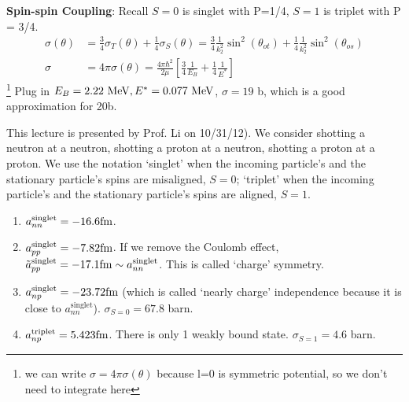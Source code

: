 \documentclass{school-22.101-notes}
\begin{document}
\textbf{Spin-spin Coupling}: Recall $S=0$ is singlet with P=1/4, $S=1$ is triplet with P = 3/4. 
\begin{align}
\sigma( \theta) &= \frac{3}{4} \sigma_T (\theta) + \frac{1}{4} \sigma_S (\theta) = \frac{3}{4} \frac{1}{k_2^2} \sin^2 (\theta_{ot} ) + \frac{1}{4} \frac{1}{k_2^2} \sin^2 (\theta_{os} ) \\
\sigma &= 4 \pi \sigma (\theta) = \frac{4 \pi \hbar^2}{2 \mu} \left[ \frac{3}{4} \frac{1}{E_B} + \frac{1}{4} \frac{1}{E^*} \right] 
\end{align}\footnote{we can write $\sigma = 4 \pi \sigma(\theta)$ because l=0 is symmetric potential, so we don't need to integrate here} 
Plug in $E_B = 2.22 \mbox{ } \mathrm{MeV}, E^* = 0.077 \mbox{ } \mathrm{MeV}$, $\sigma = 19$ b, which is a good approximation for 20b. 



This lecture is presented by Prof. Li on 10/31/12). We consider shotting a neutron at a neutron, shotting a proton at a neutron, shotting a proton at a proton. We use the notation `singlet' when the incoming particle's and the stationary particle's spins are misaligned, $S=0$; `triplet' when the incoming particle's and the stationary particle's spins are aligned, $S=1$. 
\begin{enumerate}
\item $\displaystyle a^{\mathrm{singlet}}_{nn} = -16.6 \mathrm{fm}$. 
\item $\displaystyle a^{\mathrm{singlet}}_{pp} = -7.82 \mathrm{fm}$. If we remove the Coulomb effect, $\displaystyle \tilde{a}^{\mathrm{singlet}}_{pp} = -17.1 \mathrm{fm} \sim a^{\mathrm{singlet}}_{nn}$. This is called `charge' symmetry. 
\item $\displaystyle a^{\mathrm{singlet}}_{np} = -23.72 \mathrm{fm}$ (which is called `nearly charge' independence because it is close to $a^{\mathrm{singlet}}_{nn}$). $\displaystyle \sigma_{S=0} = 67.8$ barn. 
\item $\displaystyle a^{\mathrm{triplet}}_{np} = 5.423 \mathrm{fm}$. There is only 1 weakly bound state. $\displaystyle \sigma_{S=1} = 4.6$ barn. 
\end{enumerate}
\end{document}
